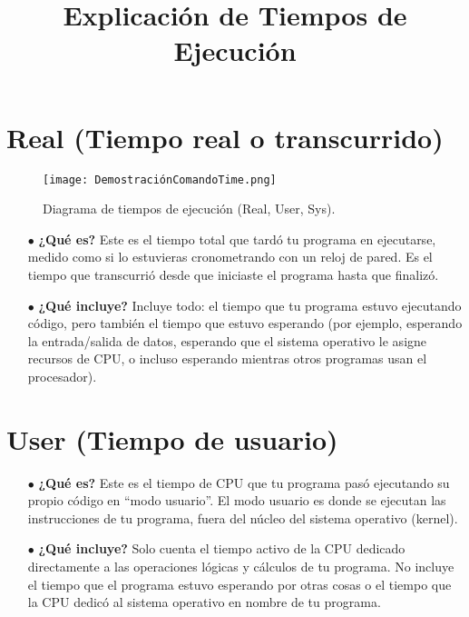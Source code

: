 \documentclass{article}
\title{Explicación de Tiempos de Ejecución}
\author{}
\date{}
\begin{document}
\maketitle

\section*{Real (Tiempo real o transcurrido)}
\begin{figure}[h]
    \centering
    \texttt{[image: DemostraciónComandoTime.png]} %
    \caption{Diagrama de tiempos de ejecución (Real, User, Sys).}
    \label{fig:tiempos}
\end{figure}
\begin{itemize}[leftmargin=*]
    \item[$\bullet$] \textbf{¿Qué es?} Este es el tiempo total que tardó tu programa en ejecutarse, medido como si lo estuvieras cronometrando con un reloj de pared. Es el tiempo que transcurrió desde que iniciaste el programa hasta que finalizó.
    
    \item[$\bullet$] \textbf{¿Qué incluye?} Incluye todo: el tiempo que tu programa estuvo ejecutando código, pero también el tiempo que estuvo esperando (por ejemplo, esperando la entrada/salida de datos, esperando que el sistema operativo le asigne recursos de CPU, o incluso esperando mientras otros programas usan el procesador).
\end{itemize}

\section*{User (Tiempo de usuario)}

\begin{itemize}[leftmargin=*]
    \item[$\bullet$] \textbf{¿Qué es?} Este es el tiempo de CPU que tu programa pasó ejecutando su propio código en ``modo usuario''. El modo usuario es donde se ejecutan las instrucciones de tu programa, fuera del núcleo del sistema operativo (kernel).
    
    \item[$\bullet$] \textbf{¿Qué incluye?} Solo cuenta el tiempo activo de la CPU dedicado directamente a las operaciones lógicas y cálculos de tu programa. No incluye el tiempo que el programa estuvo esperando por otras cosas o el tiempo que la CPU dedicó al sistema operativo en nombre de tu programa.
\end{itemize}
\end{document}
